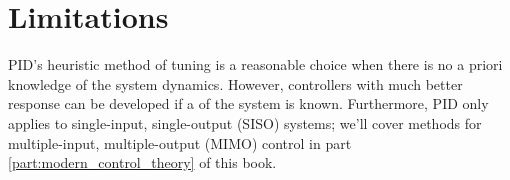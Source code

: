 \section{Limitations}

PID's heuristic method of tuning is a reasonable choice when there is no a
priori knowledge of the \gls{system} dynamics. However, controllers with much
better response can be developed if a  of the
\gls{system} is known. Furthermore, PID only applies to single-input,
single-output (SISO) \glspl{system}; we'll cover methods for multiple-input,
multiple-output (MIMO) control in part \ref{part:modern_control_theory} of this
book.
